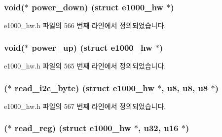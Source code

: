 \subsubsection[{\texorpdfstring{power\+\_\+down}{power_down}}]{\setlength{\rightskip}{0pt plus 5cm}void($\ast$ power\+\_\+down) (struct {\bf e1000\+\_\+hw} $\ast$)}\hypertarget{structe1000__phy__operations_a80d000e104f62b199036f3ef2c6155cc}{}\label{structe1000__phy__operations_a80d000e104f62b199036f3ef2c6155cc}


e1000\+\_\+hw.\+h 파일의 566 번째 라인에서 정의되었습니다.

\subsubsection[{\texorpdfstring{power\+\_\+up}{power_up}}]{\setlength{\rightskip}{0pt plus 5cm}void($\ast$ power\+\_\+up) (struct {\bf e1000\+\_\+hw} $\ast$)}\hypertarget{structe1000__phy__operations_ada8867e1826b125dcba1f902d0e4c336}{}\label{structe1000__phy__operations_ada8867e1826b125dcba1f902d0e4c336}


e1000\+\_\+hw.\+h 파일의 565 번째 라인에서 정의되었습니다.

\subsubsection[{\texorpdfstring{read\+\_\+i2c\+\_\+byte}{read_i2c_byte}}]{($\ast$ read\+\_\+i2c\+\_\+byte) (struct {\bf e1000\+\_\+hw} $\ast$, {\bf u8}, {\bf u8}, {\bf u8} $\ast$)}\hypertarget{structe1000__phy__operations_abedfb928b1c7d903c0ccd7d418d01bbf}{}\label{structe1000__phy__operations_abedfb928b1c7d903c0ccd7d418d01bbf}


e1000\+\_\+hw.\+h 파일의 567 번째 라인에서 정의되었습니다.

\subsubsection[{\texorpdfstring{read\+\_\+reg}{read_reg}}]{($\ast$ read\+\_\+reg) (struct {\bf e1000\+\_\+hw} $\ast$, {\bf u32}, {\bf u16} $\ast$)}\hypertarget{structe1000__phy__operations_af44e212061c26684f96a0ebad95b082d}{}\label{structe1000__phy__operations_af44e212061c26684f96a0ebad95b082d}


